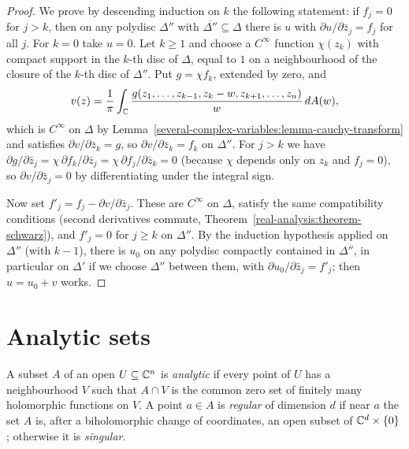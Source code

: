 \begin{proof}
We prove by descending induction on $k$ the following statement: if $f_j = 0$ for $j > k$, then on any polydisc $\Delta''$ with $\overline{\Delta''} \subseteq \Delta$ there is $u$ with
$\partial u/\partial\bar z_j = f_j$ for all $j$. For $k = 0$ take $u = 0$. Let $k \geq 1$ and choose a $C^\infty$ function $\chi(z_k)$ with compact support in the $k$-th disc of $\Delta$, equal to $1$ on a
neighbourhood of the closure of the $k$-th disc of $\Delta''$. Put $g = \chi f_k$, extended by zero, and
\[
v(z) = \frac1\pi\int_{\mathbb{C}}\frac{g(z_1, \ldots, z_{k-1}, z_k - w, z_{k+1}, \ldots, z_n)}{w}\,dA(w),
\]
which is $C^\infty$ on $\Delta$ by Lemma~\ref{several-complex-variables:lemma-cauchy-transform} and satisfies $\partial v/\partial\bar z_k = g$, so $\partial v/\partial\bar z_k = f_k$ on $\Delta''$. For
$j > k$ we have $\partial g/\partial\bar z_j = \chi\,\partial f_k/\partial\bar z_j = \chi\,\partial f_j/\partial\bar z_k = 0$ (because $\chi$ depends only on $z_k$ and $f_j = 0$), so
$\partial v/\partial\bar z_j = 0$ by differentiating under the integral sign.

Now set $f'_j = f_j - \partial v/\partial\bar z_j$. These are $C^\infty$ on $\Delta$, satisfy the same compatibility conditions (second derivatives commute,
Theorem~\ref{real-analysis:theorem-schwarz}), and $f'_j = 0$ for $j \geq k$ on $\Delta''$. By the induction hypothesis applied on $\Delta''$ (with $k - 1$), there is $u_0$ on any polydisc compactly
contained in $\Delta''$, in particular on $\Delta'$ if we choose $\Delta''$ between them, with $\partial u_0/\partial\bar z_j = f'_j$; then $u = u_0 + v$ works.
\end{proof}

\section{Analytic sets}\label{several-complex-variables:section-analytic-sets}

\begin{definition}\label{several-complex-variables:definition-analytic-set}
A subset $A$ of an open $U \subseteq \mathbb{C}^n$ is \emph{analytic} if every point of $U$ has a neighbourhood $V$ such that $A \cap V$ is the common zero set of finitely many holomorphic functions on $V$. A point
$a \in A$ is \emph{regular} of dimension $d$ if near $a$ the set $A$ is, after a biholomorphic change of coordinates, an open subset of $\mathbb{C}^d \times \{0\}$; otherwise it is \emph{singular}.
\end{definition}

